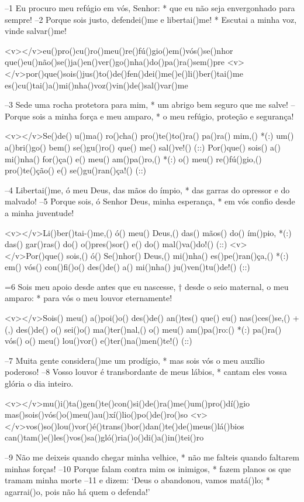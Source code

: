 –1 Eu procuro meu refúgio em vós, Senhor: *
que eu não seja envergonhado para sempre!
–2 Porque sois justo, defendei()me e libertai()me! *
Escutai a minha voz, vinde salvar()me!

<v></v>eu()pro()cu()ro()meu()re()fú()gio()em()vós()se()nhor
que()eu()não()se()ja()en()ver()go()nha()do()pa()ra()sem()pre
<v></v>por()que()sois()jus()to()de()fen()dei()me()e()li()ber()tai()me
es()cu()tai()a()mi()nha()voz()vin()de()sal()var()me

–3 Sede uma rocha protetora para mim, *
um abrigo bem seguro que me salve!
– Porque sois a minha força e meu amparo, *
o meu refúgio, proteção e segurança!

<v></v>Se()de() u()ma() ro()cha() pro()te()to()ra() pa()ra() mim,() *(:)
um() a()bri()go() bem() se()gu()ro() que() me() sal()ve!() (::)
Por()que() sois() a() mi()nha() for()ça() e() meu() am()pa()ro,() *(:)
o() meu() re()fú()gio,() pro()te()ção() e() se()gu()ran()ça!() (::)

–4 Libertai()me, ó meu Deus, das mãos do ímpio, *
das garras do opressor e do malvado!
–5 Porque sois, ó Senhor Deus, minha esperança, *
em vós confio desde a minha juventude!

<v></v>Li()ber()tai-()me,() ó() meu() Deus,() das() mãos() do() ím()pio, *(:)
das() gar()ras() do() o()pres()sor() e() do() mal()va()do!() (::)
<v></v>Por()que() sois,() ó() Se()nhor() Deus,() mi()nha() es()pe()ran()ça,() *(:)
em() vós() con()fi()o() des()de() a() mi()nha() ju()ven()tu()de!() (::)

=6 Sois meu apoio desde antes que eu nascesse, †
desde o seio maternal, o meu amparo: *
para vós o meu louvor eternamente!

<v></v>Sois() meu() a()poi()o() des()de() an()tes() que() eu() nas()ces()se,() +(,)
des()de() o() sei()o() ma()ter()nal,() o() meu() am()pa()ro:() *(:)
pa()ra() vós() o() meu() lou()vor() e()ter()na()men()te!() (::)

–7 Muita gente considera()me um prodígio, *
mas sois vós o meu auxílio poderoso!
–8 Vosso louvor é transbordante de meus lábios, *
cantam eles vossa glória o dia inteiro.

<v></v>mu()i()ta()gen()te()con()si()de()ra()me()um()pro()dí()gio
mas()sois()vós()o()meu()au()xí()lio()po()de()ro()so
<v></v>vos()so()lou()vor()é()trans()bor()dan()te()de()meus()lá()bios
can()tam()e()les()vos()sa()gló()ria()o()di()a()in()tei()ro

–9 Não me deixeis quando chegar minha velhice, *
não me falteis quando faltarem minhas forças!
–10 Porque falam contra mim os inimigos, *
fazem planos os que tramam minha morte
–11 e dizem: ‘Deus o abandonou, vamos matá()lo; *
agarrai()o, pois não há quem o defenda!’

